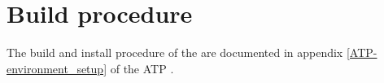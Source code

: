 \chapter{Build procedure}
\label{chap:buildProcedure}

The build and install procedure of the \applicationname{} are documented in appendix \ref*{ATP-environment_setup} of the ATP \cite{atp}.
